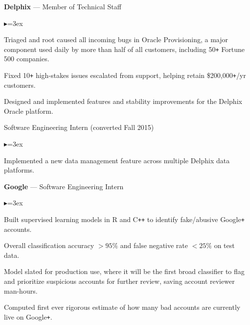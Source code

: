\documentclass[10pt,letterpaper]{article}
\newcommand{\jobhead}[3]{{\dates{#1}{\bf #3} --- {#2}}}
\newenvironment{jobs}
	{\vspace{-2ex}\leftmargini=24.1mm%
	 \begin{list}%
		{}
		{\setlength\labelwidth{22mm}\itemsep=-1.5mm}}
	{\end{list}\vspace{-2ex}}
\def\dates#1{\item[#1\hfill]}
\newenvironment{myitemize}
{
\vspace{-1.1ex}
    \begin{list}
{\tiny\raise2.25pt\hbox{$\blacktriangleright$}}{\leftmargin=3ex}
        \setlength{\topsep}{0pt}
        \setlength{\parskip}{0pt}
        \setlength{\partopsep}{0pt}
        \setlength{\parsep}{0pt}
        \setlength{\itemsep}{0pt}
}
{
    \end{list}
\vspace{-0.5ex}
}
\begin{document}
\begin{jobs}

\jobhead{2015\,--\,2016}
{Member of Technical Staff}{Delphix}
\begin{myitemize}

\item Triaged and root caused all incoming bugs in Oracle Provisioning,
a major component used daily by more than half of all customers,
including 50\verb!+! Fortune 500 companies.

\item Fixed 10\verb!+! high-stakes issues escalated from support, helping
retain \$200,000\verb!+!/yr customers.

\item Designed and implemented features and
stability improvements for the Delphix Oracle platform.

\end{myitemize}
\dates{2015}
Software Engineering Intern (converted Fall 2015)
\begin{myitemize}
\item Implemented a new data management feature across multiple Delphix
data platforms.
\end{myitemize}

\phantom{Words}

\jobhead{2014}
{Software Engineering Intern}{Google}
\begin{myitemize}

\item Built supervised learning models in R and C\verb!++! to identify
fake/abusive Google\verb!+! accounts.



\item Overall classification accuracy $>\!95\%$ and
false negative rate $<\!25\%$ on test data.

\item Model slated for production use, where it will be the first broad
classifier to flag and prioritize suspicious accounts
for further review, saving account reviewer man-hours.

\item Computed first ever rigorous estimate of how many bad accounts are
currently live on Google\verb!+!.


\end{myitemize}
\end{jobs}
\end{document}
